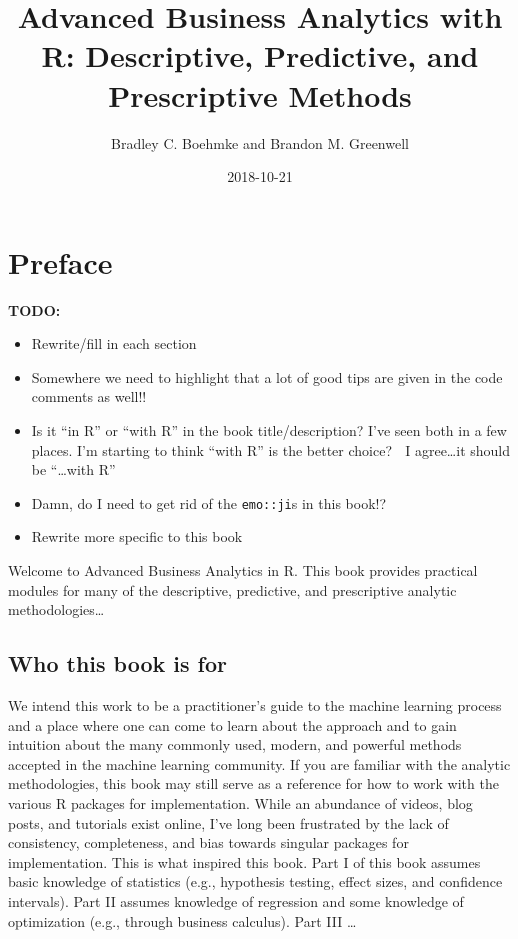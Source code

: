 \documentclass[]{book}
\title{Advanced Business Analytics with R: Descriptive, Predictive, and
Prescriptive Methods}
\author{Bradley C. Boehmke and Brandon M. Greenwell}
\date{2018-10-21}
\theoremstyle{definition}
\theoremstyle{definition}
\theoremstyle{definition}
\theoremstyle{remark}
\begin{document}
\maketitle

{
\setcounter{tocdepth}{1}
\tableofcontents
}
\hypertarget{preface}{%
\chapter*{Preface}\label{preface}}

\textbf{TODO:}

\begin{itemize}
\item
  Rewrite/fill in each section
\item
  Somewhere we need to highlight that a lot of good tips are given in
  the code comments as well!!
\item
  Is it ``in R'' or ``with R'' in the book title/description? I've seen
  both in a few places. I'm starting to think ``with R'' is the better
  choice? 🤔 I agree\ldots{}it should be ``\ldots{}with R''
\item
  Damn, do I need to get rid of the \texttt{emo::ji}s in this book!?
\item
  Rewrite more specific to this book
\end{itemize}

Welcome to Advanced Business Analytics in R. This book provides
practical modules for many of the descriptive, predictive, and
prescriptive analytic methodologies\ldots{}

\hypertarget{who-this-book-is-for}{%
\section*{Who this book is for}\label{who-this-book-is-for}}

We intend this work to be a practitioner's guide to the machine learning
process and a place where one can come to learn about the approach and
to gain intuition about the many commonly used, modern, and powerful
methods accepted in the machine learning community. If you are familiar
with the analytic methodologies, this book may still serve as a
reference for how to work with the various R packages for
implementation. While an abundance of videos, blog posts, and tutorials
exist online, I've long been frustrated by the lack of consistency,
completeness, and bias towards singular packages for implementation.
This is what inspired this book. Part I of this book assumes basic
knowledge of statistics (e.g., hypothesis testing, effect sizes, and
confidence intervals). Part II assumes knowledge of regression and some
knowledge of optimization (e.g., through business calculus). Part III
\ldots{}
\end{document}
